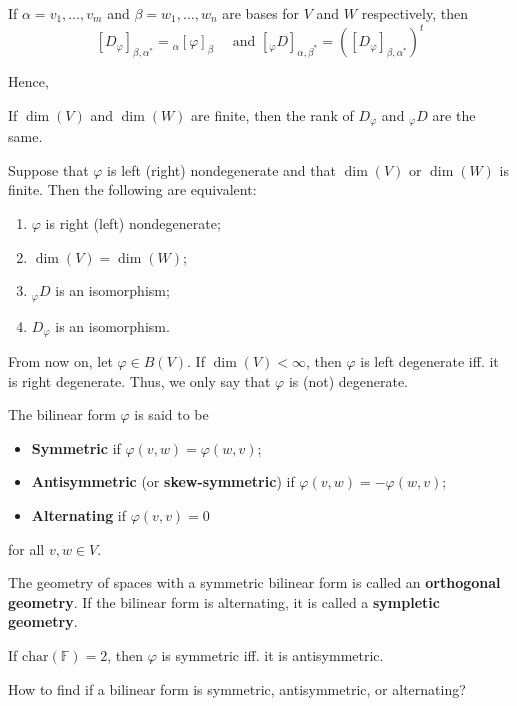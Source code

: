 If $\alpha = v_1, \ldots, v_m$ and $\beta = w_1, \ldots, w_n$ are bases for $V$ and $W$ respectively, then 
\[
  [D_\varphi]_{\beta, \alpha^\ast} = {}_\alpha [\varphi]_\beta \quad \text{ and } [{}_\varphi D]_{\alpha, \beta^\ast} = ([D_\varphi]_{\beta, \alpha^\ast})^t
\]

Hence,
\begin{theorem}
  If $\dim(V)$ and $\dim(W)$ are finite, then the rank of $D_\varphi$ and ${}_\varphi D$ are the same.
\end{theorem}

\begin{corollary}
  Suppose that $\varphi$ is left (right) nondegenerate and that $\dim(V)$ or $\dim(W)$ is finite. Then the following are equivalent: 
  \begin{enumerate}
    \item $\varphi$ is right (left) nondegenerate; 
    \item $\dim(V) = \dim(W)$;
    \item ${}_\varphi D$ is an isomorphism; 
    \item $D_\varphi$ is an isomorphism.
  \end{enumerate}
\end{corollary}

From now on, let $\varphi \in B(V)$. If $\dim(V) < \infty$, then $\varphi$ is left degenerate iff. it is right degenerate. Thus, we only say that $\varphi$ is (not) degenerate.

\begin{definition}
  The bilinear form $\varphi$ is said to be 
  \begin{itemize}
    \item \textbf{Symmetric} if $\varphi(v,w) = \varphi(w,v)$;
    \item \textbf{Antisymmetric} (or \textbf{skew-symmetric}) if $\varphi(v,w) = -\varphi(w,v)$;
    \item \textbf{Alternating} if $\varphi(v,v) = 0$ 
  \end{itemize}
  for all $v, w \in V$. 
\end{definition}

The geometry of spaces with a symmetric bilinear form is called an \textbf{orthogonal geometry}. If the bilinear form is alternating, it is called a \textbf{sympletic geometry}. 

If $\text{char}(\mathbb{F}) = 2$, then $\varphi$ is symmetric iff. it is antisymmetric. 

How to find if a bilinear form is symmetric, antisymmetric, or alternating? 

